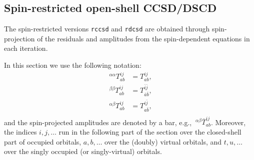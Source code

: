\documentclass[a4paper,12pt,oneside]{book}
\newcommand{\spa}[1]{{#1}}
\newcommand{\spb}[1]{\bar{#1}}
\newcommand{\cmd}[1]{\texttt{#1}}
\begin{document}
\subsection{Spin-restricted open-shell CCSD/DSCD}
The spin-restricted versions \cmd{rccsd} and \cmd{rdcsd} are obtained through spin-projection of the
residuals and amplitudes from the spin-dependent equations in each iteration. \cite{knowlesCoupled1993,knowlesErratum2000a} 

In this section we use the following notation:
\begin{equation}
\begin{aligned}
  ~^{αα}T^{ij}_{ab} &= T^{\spa{i}\spa{j}}_{\spa{a}\spa{b}}, \\
  ~^{ββ}T^{ij}_{ab} &= T^{\spb{i}\spb{j}}_{\spb{a}\spb{b}}, \\
  ~^{αβ}T^{ij}_{ab} &= T^{\spa{i}\spb{j}}_{\spa{a}\spb{b}}, \\
\end{aligned}
\end{equation}
and the spin-projected amplitudes are denoted by a bar, e.g., $~^{αβ}\bar T^{ij}_{ab}$.
Moreover, the indices $i,j,\ldots$ run in the following part of the section over the closed-shell part of occupied orbitals, $a,b,\ldots$ over the (doubly) virtual orbitals, 
and $t,u,\ldots$ over the singly occupied (or singly-virtual) orbitals.
\end{document}
